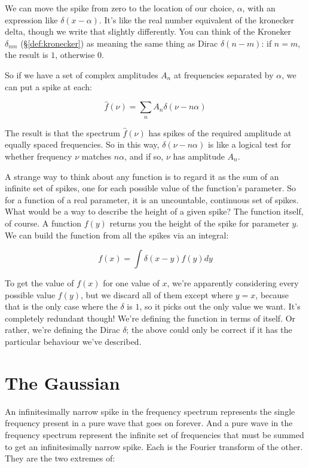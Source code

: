 We can move the spike from zero to the location of our choice, $\alpha$, with an expression like $\delta(x - \alpha)$. It's like the real number equivalent of the kronecker delta, though we write that slightly differently. You can think of the Kroneker $\delta_{nm}$ (§\ref{def:kronecker}) as meaning the same thing as Dirac $\delta(n - m)$: if $n = m$, the result is $1$, otherwise $0$.

So if we have a set of complex amplitudes $A_n$ at frequencies separated by $\alpha$, we can put a spike at each:

$$
\hat{f}(\nu) =
\sum_n A_n \delta(\nu - n\alpha)
$$

The result is that the spectrum $\hat{f}(\nu)$ has spikes of the required amplitude at equally spaced frequencies. So in this way, $\delta(\nu - n\alpha)$ is like a logical test for whether frequency $\nu$ matches $n\alpha$, and if so, $\nu$ has amplitude $A_n$.

A strange way to think about any function is to regard it as the sum of an infinite set of spikes, one for each possible value of the function's parameter. So for a function of a real parameter, it is an uncountable, continuous set of spikes. What would be a way to describe the height of a given spike? The function itself, of course. A function $f(y)$ returns you the height of the spike for parameter $y$. We can build the function from all the spikes via an integral:

$$
f(x) = \int \delta(x - y) f(y) dy
$$

To get the value of $f(x)$ for one value of $x$, we're apparently considering every possible value $f(y)$, but we discard all of them except where $y = x$, because that is the only case where the $\delta$ is $1$, so it picks out the only value we want. It's completely redundant though! We're defining the function in terms of itself. Or rather, we're defining the Dirac $\delta$; the above could only be correct if it has the particular behaviour we've described.

\section{The Gaussian}

An infinitesimally narrow spike in the frequency spectrum represents the single frequency present in a pure wave that goes on forever. And a pure wave in the frequency spectrum represent the infinite set of frequencies that must be summed to get an infinitesimally narrow spike. Each is the Fourier transform of the other. They are the two extremes of:

